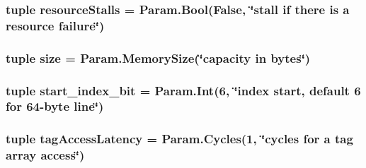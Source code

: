 \label{classCache_1_1RubyCache_abe3a9f09e93027c7a960442bd92af2da}
\hypertarget{classCache_1_1RubyCache_ab2a0030d9d6b879176bc79b5557e75d5}{
\subsubsection[{resourceStalls}]{\setlength{\rightskip}{0pt plus 5cm}tuple {\bf resourceStalls} = Param.Bool(False, \char`\"{}stall if there is a resource failure\char`\"{})}}
\label{classCache_1_1RubyCache_ab2a0030d9d6b879176bc79b5557e75d5}
\hypertarget{classCache_1_1RubyCache_a377e5da8df1f89c5468c8b8cd07eac89}{
\subsubsection[{size}]{\setlength{\rightskip}{0pt plus 5cm}tuple {\bf size} = Param.MemorySize(\char`\"{}capacity in bytes\char`\"{})}}
\label{classCache_1_1RubyCache_a377e5da8df1f89c5468c8b8cd07eac89}
\hypertarget{classCache_1_1RubyCache_a9b48e581ffca2622c826582a361b4bf1}{
\subsubsection[{start\_\-index\_\-bit}]{\setlength{\rightskip}{0pt plus 5cm}tuple {\bf start\_\-index\_\-bit} = Param.Int(6, \char`\"{}index start, default 6 for 64-\/byte line\char`\"{})}}
\label{classCache_1_1RubyCache_a9b48e581ffca2622c826582a361b4bf1}
\hypertarget{classCache_1_1RubyCache_a6326c35602f2f8cea6b953033f57f4f6}{
\subsubsection[{tagAccessLatency}]{\setlength{\rightskip}{0pt plus 5cm}tuple {\bf tagAccessLatency} = Param.Cycles(1, \char`\"{}cycles for a tag array access\char`\"{})}}
